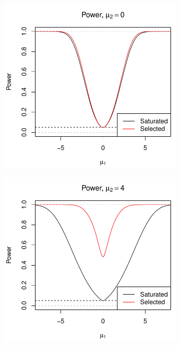 \documentclass{article}
\begin{document}
\begin{figure}
  \centering
  \begin{subfigure}[t]{.4\textwidth}
    \includegraphics[width=\textwidth]{figs/bivariateSelVSat_powCurves_0.pdf}
  \end{subfigure}
  \hspace{.1\textwidth}
  \begin{subfigure}[t]{.4\textwidth}
    \includegraphics[width=\textwidth]{figs/bivariateSelVSat_powCurves_4.pdf}

\end{subfigure}
\end{figure}
\end{document}
